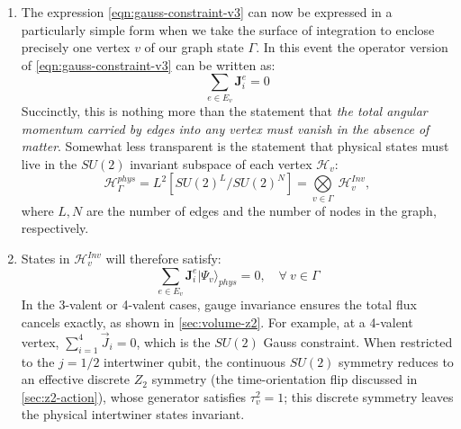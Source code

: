 \documentclass[preprint]{SciPost}
\newcommand{\mb}[1]{\mathbf{#1}}
\newcommand{\mc}[1]{\mathcal{#1}}
\newcommand{\ket}[1]{\vert #1 \rangle}
\theoremstyle{plain} %
\newcommand{\GPTEnd}{\par\noindent\textcolor{GPTMarker}{\texttt{\textless\textless{} Sol 6.1 Medium End \textgreater\textgreater}}\par}
\begin{document}
\begin{enumerate}[label=\arabic*.]
For $j=1/2$ and $\hbar=1$, the angular momentum operators are $\hat J_i=\sigma_i/2$, where $\sigma_i$ are the Pauli matrices.

\GPTEnd{}

		\item The expression \eqref{eqn:gauss-constraint-v3} can now be expressed in a particularly simple form when we take the surface of integration to enclose precisely one vertex $ v $ of our graph state $ \Gamma $. In this event the operator version of \eqref{eqn:gauss-constraint-v3} can be written as:
		\begin{equation}\label{eqn:gauss-operator-v1}
		\sum_{e \in E_v} \mb{J}^e_i = 0
		\end{equation}
		Succinctly, this is nothing more than the statement that \emph{the total angular momentum carried by edges into any vertex must vanish in the absence of matter}. Somewhat less transparent is the statement that physical states must live in the $ SU(2) $ invariant subspace of each vertex $ \mc{H}_v $:
		\begin{equation}\label{eqn:su2-invariant-space}
		\mc{H}_\Gamma^{phys} = L^2\left[SU(2)^L/SU(2)^N\right] = \underset{v \in \Gamma}{\bigotimes}~ \mathcal{H}_v^{Inv},
		\end{equation}
        where $ L, N $ are the number of edges and the number of nodes in the graph, respectively.
		\item States in $ \mc{H}_v^{Inv} $ will therefore satisfy:
		\begin{equation}\label{eqn:gauss-operator-v2}
		\sum_{e \in E_v} \mb{J}^e_i \ket{\Psi_v}_{phys} = 0, \quad \forall~v \in \Gamma
		\end{equation}
		In the 3-valent or 4-valent cases, gauge invariance ensures the total flux cancels exactly, as shown in \autoref{sec:volume-z2}. For example, at a 4-valent vertex, $\sum_{i=1}^4 \vec{J}_i = 0$, which is the $SU(2)$ Gauss constraint. When restricted to the $j=1/2$ intertwiner qubit, the continuous $SU(2)$ symmetry reduces to an effective discrete $Z_2$ symmetry (the time-orientation flip discussed in \autoref{sec:z2-action}), whose generator satisfies $\tau_v^2 = 1$; this discrete symmetry leaves the physical intertwiner states invariant.
	\end{enumerate}
\end{document}
